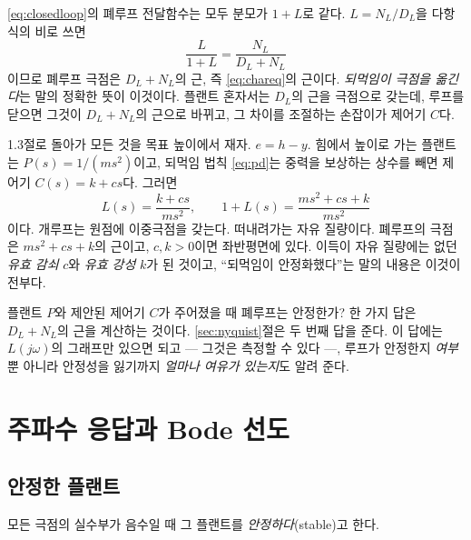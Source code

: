 \documentclass[11pt]{article}
\begin{document}
\eqref{eq:closedloop}의 폐루프 전달함수는 모두 분모가 $1+L$로 같다. $L=N_L/D_L$을
다항식의 비로 쓰면
\[
   \frac{L}{1+L} = \frac{N_L}{D_L+N_L}
\]
이므로 폐루프 극점은 $D_L+N_L$의 근, 즉 \eqref{eq:chareq}의 근이다.
\emph{되먹임이 극점을 옮긴다}는 말의 정확한 뜻이 이것이다. 플랜트 혼자서는
$D_L$의 근을 극점으로 갖는데, 루프를 닫으면 그것이 $D_L+N_L$의 근으로 바뀌고,
그 차이를 조절하는 손잡이가 제어기 $C$다.

\begin{example}\label{ex:massloop}
1.3절로 돌아가 모든 것을 목표 높이에서 재자. $e=h-y$. 힘에서 높이로 가는
플랜트는 $P(s)=1/(ms^{2})$이고, 되먹임 법칙 \eqref{eq:pd}는 중력을 보상하는
상수를 빼면 제어기 $C(s)=k+cs$다. 그러면
\[
   L(s) = \frac{k+cs}{ms^{2}},
   \qquad
   1+L(s) = \frac{ms^{2}+cs+k}{ms^{2}}
\]
이다. 개루프는 원점에 이중극점을 갖는다. 떠내려가는 자유 질량이다. 폐루프의
극점은 $ms^{2}+cs+k$의 근이고, $c,k>0$이면 좌반평면에 있다. 이득이 자유 질량에는
없던 \emph{유효 감쇠} $c$와 \emph{유효 강성} $k$가 된 것이고, ``되먹임이
안정화했다''는 말의 내용은 이것이 전부다.
\end{example}

\begin{question}
플랜트 $P$와 제안된 제어기 $C$가 주어졌을 때 폐루프는 안정한가? 한 가지 답은
$D_L+N_L$의 근을 계산하는 것이다. \ref{sec:nyquist}절은 두 번째 답을 준다. 이
답에는 $L(j\omega)$의 그래프만 있으면 되고 --- 그것은 측정할 수 있다 ---, 루프가
안정한지 \emph{여부}뿐 아니라 안정성을 잃기까지 \emph{얼마나 여유가 있는지}도
알려 준다.
\end{question}


\section{주파수 응답과 Bode 선도}\label{sec:freq}

\subsection{안정한 플랜트}
\begin{definition}\label{def:stable}
모든 극점의 실수부가 음수일 때 그 플랜트를 \emph{안정하다}(stable)고 한다.
\end{definition}
\end{document}
